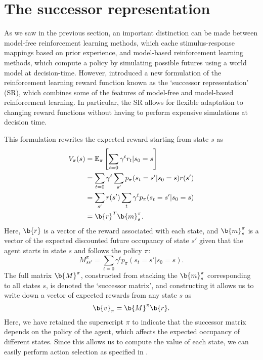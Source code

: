 \section{The successor representation}
\label{sec:SR}

As we saw in the previous section, an important distinction can be made between model-free reinforcement learning methods, which cache stimulus-response mappings based on prior experience, and model-based reinforcement learning methods, which compute a policy by simulating possible futures using a world model at decision-time.
However, \citet{dayan1993improving} introduced a new formulation of the reinforcement learning reward function known as the `successor representation' (SR), which combines some of the features of model-free and model-based reinforcement learning.
In particular, the SR allows for flexible adaptation to changing reward functions without having to perform expensive simulations at decision time.

This formulation rewrites the expected reward starting from state $s$ as
\begin{align}
    V_\pi(s) &= \mathbb{E}_\pi \left [ \sum_{t = 0} \gamma^t r_t | s_0 = s\right ] \\
    &= \sum_{t = 0} \gamma^t \sum_{s'} p_\pi(s_t = s' | s_0 = s) r(s')\\
    &= \sum_{s'} r(s') \sum_t \gamma^t p_\pi(s_t = s' | s_0 = s)\\
    &= \b{r}^T \b{m}^\pi_s.
\end{align}
Here, $\b{r}$ is a vector of the reward associated with each state, and $\b{m}^\pi_s$ is a vector of the expected discounted future occupancy of state $s'$ given that the agent starts in state $s$ and follows the policy $\pi$:
\begin{equation}
    M^\pi_{s s'} = \sum_{t = 0} \gamma^t p_\pi(s_t = s' | s_0 = s).
\end{equation}
The full matrix $\b{M}^\pi$, constructed from stacking the $\b{m}^\pi_s$ corresponding to all states $s$, is denoted the `successor matrix', and constructing it allows us to write down a vector of expected rewards from any state $s$ as
\begin{equation}
    \b{v}_\pi = \b{M}^\pi \b{r}.
\end{equation}
Here, we have retained the superscript $\pi$ to indicate that the successor matrix depends on the policy of the agent, which affects the expected occupancy of different states.
Since this allows us to compute the value of each state, we can easily perform action selection as specified in .

